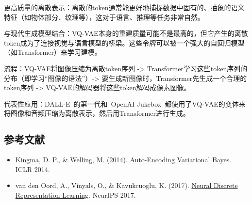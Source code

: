 更高质量的离散表示：离散的token通常能更好地捕捉数据中固有的、抽象的语义特征（如物体部分、纹理等），这对于语言、推理等任务非常自然。

与现代生成模型结合：VQ-VAE本身的重建质量可能不是最高的，但它产生的离散token成为了连接视觉与语言模型的桥梁。这些令牌可以被一个强大的自回归模型（如Transformer）来学习建模。

流程：VQ-VAE将图像压缩为离散token序列 -\textgreater{} Transformer学习这些token序列的分布（即学习``图像的语法''）-\textgreater{} 要生成新图像时，Transformer先生成一个合理的token序列 -\textgreater{} VQ-VAE的解码器将这些token解码成像素图像。

代表性应用：DALL-E~的第一代和~OpenAI Jukebox~都使用了VQ-VAE的变体来将图像和音频压缩为离散表示，然后用Transformer进行生成。

\hypertarget{ux53c2ux8003ux6587ux732e-38}{%
\subsection{参考文献}\label{ux53c2ux8003ux6587ux732e-38}}

\begin{itemize}
\tightlist
\item
  Kingma, D. P., \& Welling, M. (2014). \href{https://arxiv.org/abs/1312.6114}{Auto-Encoding Variational Bayes}. ICLR 2014.
\item
  van den Oord, A., Vinyals, O., \& Kavukcuoglu, K. (2017). \href{https://arxiv.org/abs/1711.00937}{Neural Discrete Representation Learning}. NeurIPS 2017.
\end{itemize}

\clearpage
